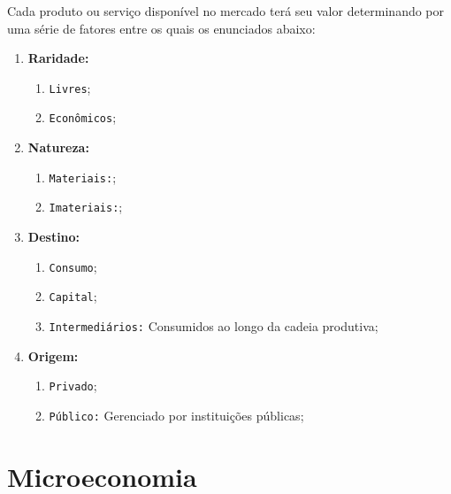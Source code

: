 \documentclass{article}
\begin{document}
            Cada produto ou serviço disponível no mercado terá seu valor determinando por uma série de fatores entre os quais os enunciados abaixo:
                \begin{enumerate}
                    \item \textbf{Raridade:}
                        \begin{enumerate}[noitemsep]
                            \item \texttt{Livres};
                            \item \texttt{Econômicos};
                        \end{enumerate}

                    \item \textbf{Natureza:}
                        \begin{enumerate}[noitemsep]
                            \item \texttt{Materiais:};
                            \item \texttt{Imateriais:};
                        \end{enumerate}

                    \item \textbf{Destino:}
                        \begin{enumerate}[noitemsep]
                            \item \texttt{Consumo};
                            \item \texttt{Capital};
                            \item \texttt{Intermediários:} Consumidos ao longo da cadeia produtiva;
                        \end{enumerate}

                    \item \textbf{Origem:}
                        \begin{enumerate}[noitemsep]
                            \item \texttt{Privado};
                            \item \texttt{Público:} Gerenciado por instituições públicas;
                        \end{enumerate}
                \end{enumerate}

    \section{Microeconomia}
\end{document}
